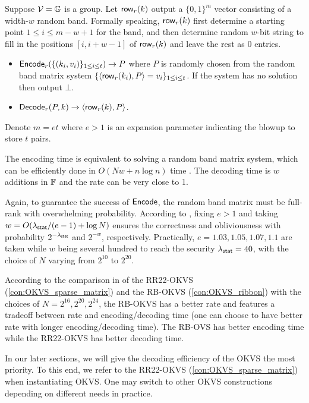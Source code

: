 \begin{construction}\label{con:OKVS_ribbon}
  Suppose $\mathcal{V} = \mathbb{G}$ is a group. Let ${\sf row}_r(k)$ output a $\{0,1\}^m$ vector consisting of a width-$w$ random band. Formally speaking, ${\sf row}_r(k)$ first determine a starting point $1\le i\le m-w+1$ for the band, and then determine random $w$-bit string to fill in the positions $[i,i+w-1]$ of ${\sf row}_r(k)$ and leave the rest as 0 entries. 
  \begin{itemize}
    \item ${\sf Encode}_r(\{(k_i,v_i)\}_{1\le i\le t})\rightarrow P$ where $P$ is randomly chosen from the random band matrix system $\{\langle {\sf row}_r(k_i), P \rangle=v_i\}_{1\le i\le t}$. If the system has no solution then output $\bot$. 
    \item ${\sf Decode}_r(P,k)\rightarrow \langle {\sf row}_r(k), P \rangle$. 
  \end{itemize}
  Denote $m=et$ where $e>1$ is an expansion parameter indicating the blowup to store $t$ pairs. 
\end{construction}

The encoding time is equivalent to solving a random band matrix system, which can be efficiently done in $O(Nw+n\log n)$ time \cite{cryptoeprint:2023/903}. The decoding time is $w$ additions in $\mathbb{F}$ and the rate can be very close to 1. 

Again, to guarantee the success of ${\sf Encode}$, the random band matrix must be full-rank with overwhelming probability. According to \cite{cryptoeprint:2023/903}, fixing $e>1$ and taking $w = O(\lambda_{\sf stat}/(e-1)+\log N)$ ensures the correctness and obliviousness with probability $2^{-\lambda_{\sf stat}}$ and $2^{-w}$, respectively. Practically, $e=1.03,1.05,1.07,1.1$ are taken while $w$ being several hundred to reach the security $\lambda_{\sf stat}=40$, with the choice of $N$ varying from $2^{10}$ to $2^{20}$. 

According to the comparison in \cite{cryptoeprint:2023/903} of the RR22-OKVS (\cref{con:OKVS_sparse_matrix}) and the RB-OKVS (\cref{con:OKVS_ribbon}) with the choices of $N = 2^{16}, 2^{20}, 2^{24}$, the RB-OKVS has a better rate and features a tradeoff between rate and encoding/decoding time (one can choose to have better rate with longer encoding/decoding time). The RB-OVS has better encoding time while the RR22-OKVS has better decoding time. 


\medskip

In our later sections, we will give the decoding efficiency of the OKVS the most priority. To this end, we refer to the RR22-OKVS (\cref{con:OKVS_sparse_matrix}) when instantiating OKVS. One may switch to other OKVS constructions depending on different needs in practice. 
